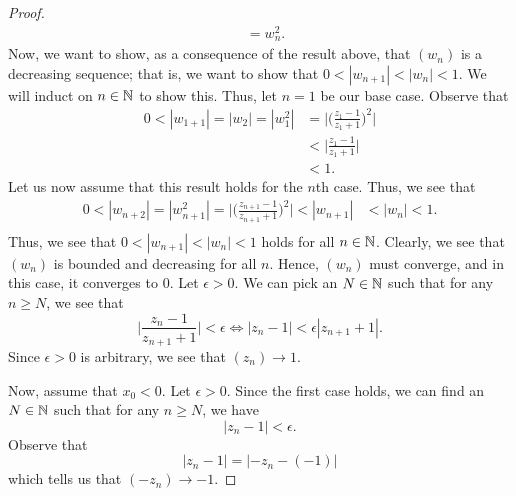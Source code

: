 \documentclass[a4paper]{article}
\begin{document}
\begin{enumerate}
\begin{proof}
\begin{align*}
                      &= {w}_{n}^{2}.
        \end{align*}
        Now, we want to show, as a consequence of the result  above, that \( ({w}_{n}) \) is a decreasing sequence; that is, we want to show that  \( 0 < |  {w}_{n + 1}  |  < | {w}_{n} |  < 1 \). We will induct on \( n \in \mathbb{N}  \) to show this. Thus, let \( n = 1  \) be our base case. Observe that
        \begin{align*}
            0 < | {w}_{1 + 1} |  = | {w}_{2} | = | {w}_{1}^{2} | &= \Big| \Big(  \frac{ {z}_{1} - 1  }{  {z}_{1} + 1  } \Big)^{2} \Big|  \\
                                                             &< \Big|  \frac{ {z}_{1} - 1  }{ {z}_{1} + 1  }  \Big|  \\
                                                             &< 1.
        \end{align*}
        Let us now assume that this result holds for the \( n \)th case. Thus, we see that
        \begin{align*}
            0 < | {w}_{n+2} |  = | {w}_{n+1}^{2} | = \Big| \Big( \frac{ {z}_{n+1} - 1  }{  {z}_{n+1} + 1  }    \Big)^{2} \Big|  < | {w}_{n+1}   | &< | {w}_{n} | < 1. \\
        \end{align*}
        Thus, we see that \( 0 < | {w}_{n+1} | < | {w}_{n} |  < 1  \) holds for all \( n \in \mathbb{N}  \). Clearly, we see that \( ({w}_{n}) \) is bounded and decreasing for all \( n  \). Hence, \( ({w}_{n})  \) must converge, and in this case, it converges to \( 0  \). Let \( \epsilon > 0  \). We can pick an \( N \in \mathbb{N}  \) such that for any \( n \geq N  \), we see that  
        \[  \Big| \frac{ {z}_{n} - 1  }{ {z}_{n+1} + 1  }  \Big| < \epsilon \Longleftrightarrow | {z}_{n} - 1  | < \epsilon | {z}_{n+1} + 1 |.  \]
        Since \( \epsilon > 0  \) is arbitrary, we see that \( ({z}_{n}) \to 1  \).

        Now, assume that \( {x}_{0} < 0  \). Let \( \epsilon > 0  \). Since the first case holds, we can find an \( N \in \mathbb{N}  \) such that for any \( n \geq N  \), we have  
        \[  | {z}_{n} - 1  |  < \epsilon. \]
        Observe that 
        \[  | {z}_{n} - 1  | = | - {z}_{n} - (-1)   | \]
        which tells us that \( (- {z}_{n}) \to -1 \). 
        



\end{proof}
\end{enumerate}
\end{document}

